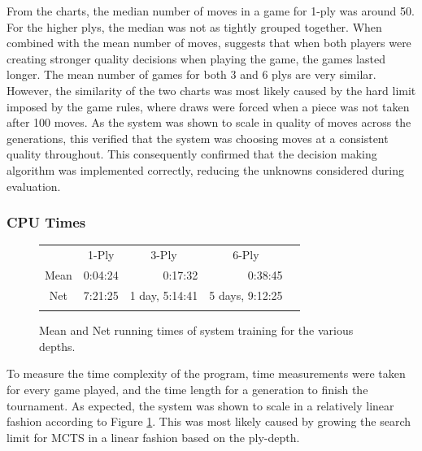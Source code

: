 \documentclass[12pt,a4paper]{article}
\begin{document}
            From the charts, the median number of moves in a game for 1-ply was around 50. 
            For the higher plys, the median was not as tightly grouped together. When combined with the mean number of moves, suggests that when both players were creating stronger quality decisions when playing the game, the games lasted longer. The mean number of games for both 3 and 6 plys are very similar. However, the similarity of the two charts was most likely caused by the hard limit imposed by the game rules, where draws were forced when a piece was not taken after 100 moves. 
            As the system was shown to scale in quality of moves across the generations, this verified that the system was choosing moves at a consistent quality throughout. This consequently confirmed that the decision making algorithm was implemented correctly, reducing the unknowns considered during evaluation.

        \subsubsection{CPU Times}

        \begin{figure}[!ht]
            \centering
    
                \begin{tabular}{ccccc}
                       & 1-Ply        & 3-Ply          & 6-Ply          & \\ \cline{2-4}
                \multicolumn{1}{c|}{Mean} & \multicolumn{1}{r|}{0:04:24} & \multicolumn{1}{r|}{0:17:32}  & \multicolumn{1}{r|}{0:38:45}   & \\ \cline{2-4}
                \multicolumn{1}{c|}{Net} & \multicolumn{1}{r|}{7:21:25} & \multicolumn{1}{r|}{1 day, 5:14:41} & \multicolumn{1}{r|}{5 days, 9:12:25} & \\ \cline{2-4}
                       &          &           &            & 
                \end{tabular}
    
            \caption{Mean and Net running times of system training for the various depths. \label{cpu_table}}
            \end{figure}


            To measure the time complexity of the program, time measurements were taken for every game played, and the time length for a generation to finish the tournament. As expected, 
            the system was shown to scale in a relatively linear fashion according to Figure \ref{cpu_table}. This was most likely caused by growing the search limit for MCTS in a linear fashion based on the ply-depth.
\end{document}
